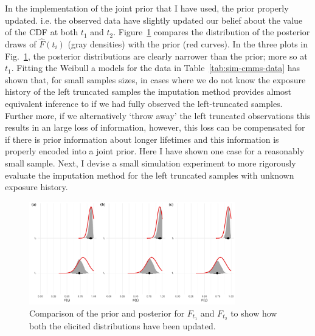 In the implementation of the joint prior that I have used, the prior properly updated. i.e. the observed data have slightly updated our belief about the value of the CDF at both $t_1$ and $t_2$. Figure~\ref{fig:weibull-prior-post-comp} compares the distribution of the posterior draws of $\hat{F}(t_i)$ (gray densities) with the prior (red curves). In the three plots in Fig.~\ref{fig:weibull-prior-post-comp}, the posterior distributions are clearly narrower than the prior; more so at $t_1$. Fitting the Weibull a models for the data in Table~\ref{tab:sim-cmms-data} has shown that, for small samples sizes, in cases where we do not know the exposure history of the left truncated samples the imputation method provides almost equivalent inference to if we had fully observed the left-truncated samples. Further more, if we alternatively `throw away' the left truncated observations this results in an large loss of information, however, this loss can be compensated for if there is prior information about longer lifetimes and this information is properly encoded into a joint prior. Here I have shown one case for a reasonably small sample. Next, I devise a small simulation experiment to more rigorously evaluate the imputation method for the left truncated samples with unknown exposure history.

\begin{figure}
    \centering
    \includegraphics[width=0.8\textwidth]{./figures/ch-2/prior-post-comp.pdf}
    \caption{Comparison of the prior and posterior for $F_{t_1}$ and $F_{t_2}$ to show how both the elicited distributions have been updated.}
    \label{fig:weibull-prior-post-comp}
\end{figure}

%
%
